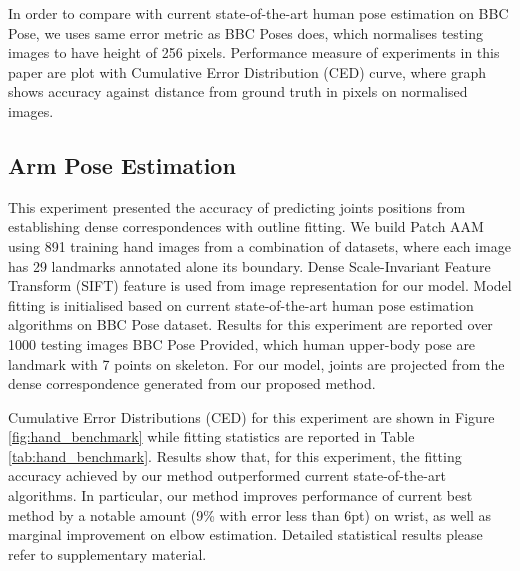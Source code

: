 In order to compare with current state-of-the-art human pose estimation on BBC Pose, we uses same error metric as BBC Poses does, which normalises testing images to have height of 256 pixels. Performance measure of experiments in this paper are plot with Cumulative Error Distribution (CED) curve, where graph shows accuracy against distance from ground truth in pixels on normalised images.

\subsection{Arm Pose Estimation}
\label{exp:benchmark}
This experiment presented the accuracy of predicting joints positions from establishing dense correspondences with outline fitting. We build Patch AAM using 891 training hand images from a combination of datasets, where each image has 29 landmarks annotated alone its boundary. Dense Scale-Invariant Feature Transform (SIFT)\cite{PoseletsICCV09} feature is used from image representation for our model. Model fitting is initialised based on current state-of-the-art human pose estimation algorithms on BBC Pose dataset. Results for this experiment are reported over 1000 testing images BBC Pose Provided, which human upper-body pose are landmark with 7 points on skeleton. For our model, joints are projected from the dense correspondence generated from our proposed method.

Cumulative Error Distributions (CED) for this experiment are shown in Figure \ref{fig:hand_benchmark} while fitting statistics are reported in Table \ref{tab:hand_benchmark}. Results show that, for this experiment, the fitting accuracy achieved by our method outperformed current state-of-the-art algorithms. In particular, our method improves performance of current best method \cite{pfister2015flowing} by a notable amount (9\% with error less than 6pt) on wrist, as well as marginal improvement on elbow estimation. Detailed statistical results please refer to supplementary material.


